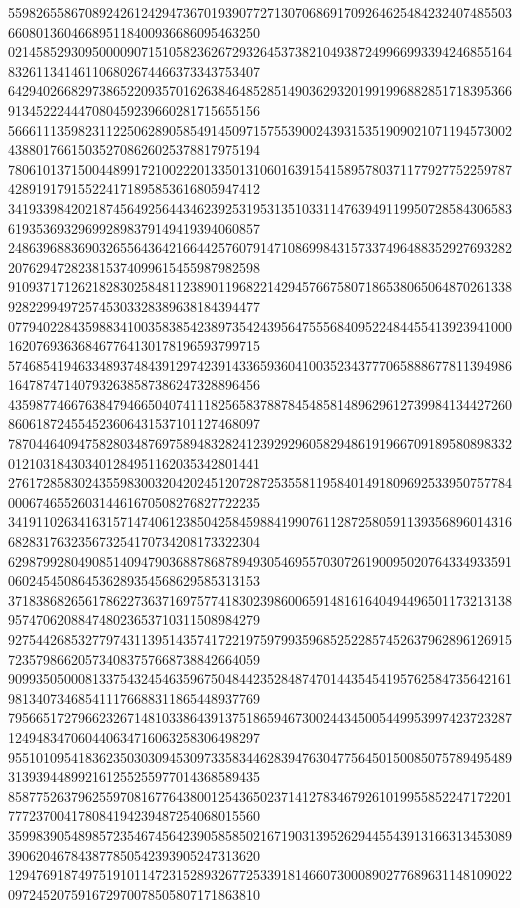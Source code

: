 \begin{DoxyCode}
      559826558670892426124294736701939077271307068691709264625484232407485503660801360466895118400936686095463250
      021458529309500009071510582362672932645373821049387249966993394246855164832611341461106802674466373343753407
      642940266829738652209357016263846485285149036293201991996882851718395366913452224447080459239660281715655156
      566611135982311225062890585491450971575539002439315351909021071194573002438801766150352708626025378817975194
      780610137150044899172100222013350131060163915415895780371177927752259787428919179155224171895853616805947412
      341933984202187456492564434623925319531351033114763949119950728584306583619353693296992898379149419394060857
      248639688369032655643642166442576079147108699843157337496488352927693282207629472823815374099615455987982598
      910937171262182830258481123890119682214294576675807186538065064870261338928229949725745303328389638184394477
      077940228435988341003583854238973542439564755568409522484455413923941000162076936368467764130178196593799715
      574685419463348937484391297423914336593604100352343777065888677811394986164787471407932638587386247328896456
      435987746676384794665040741118256583788784548581489629612739984134427260860618724554523606431537101127468097
      787044640947582803487697589483282412392929605829486191966709189580898332012103184303401284951162035342801441
      276172858302435598300320420245120728725355811958401491809692533950757784000674655260314461670508276827722235
      341911026341631571474061238504258459884199076112872580591139356896014316682831763235673254170734208173322304
      629879928049085140947903688786878949305469557030726190095020764334933591060245450864536289354568629585313153
      371838682656178622736371697577418302398600659148161640494496501173213138957470620884748023653710311508984279
      927544268532779743113951435741722197597993596852522857452637962896126915723579866205734083757668738842664059
      909935050008133754324546359675048442352848747014435454195762584735642161981340734685411176688311865448937769
      795665172796623267148103386439137518659467300244345005449953997423723287124948347060440634716063258306498297
      955101095418362350303094530973358344628394763047756450150085075789495489313939448992161255255977014368589435
      858775263796255970816776438001254365023714127834679261019955852247172201777237004178084194239487254068015560
      359983905489857235467456423905858502167190313952629445543913166313453089390620467843877850542393905247313620
      129476918749751910114723152893267725339181466073000890277689631148109022097245207591672970078505807171863810

\end{DoxyCode}
